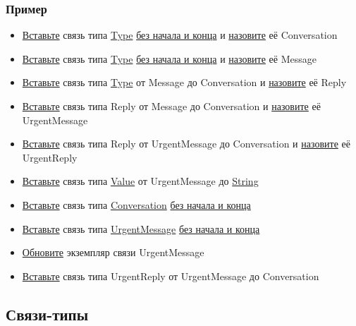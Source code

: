 \documentclass{article}
\begin{document}
\subsubsection{Пример}
\begin{itemize}
  \item \hyperlink{DeepCase.InsertLink.Def}{Вставьте} связь типа \hyperlink{type.Def}{Type} \hyperlink{FAQ.HowToInsertLinkWithoutFromAndTo}{без начала и конца} и \hyperlink{FAQ.HowToSetName}{назовите} её Conversation
  \item \hyperlink{DeepCase.InsertLink.Def}{Вставьте} связь типа \hyperlink{type.Def}{Type} \hyperlink{FAQ.HowToInsertLinkWithoutFromAndTo}{без начала и конца} и
  \hyperlink{FAQ.HowToSetName}{назовите} её Message
  \item \hyperlink{DeepCase.InsertLink.Def}{Вставьте} связь типа \hyperlink{type.Def}{Type} от Message до Conversation и \hyperlink{FAQ.HowToSetName}{назовите} её Reply
  \item \hyperlink{DeepCase.InsertLink.Def}{Вставьте} связь типа Reply от Message до Conversation и \hyperlink{FAQ.HowToSetName}{назовите} её UrgentMessage
  \item \hyperlink{DeepCase.InsertLink.Def}{Вставьте} связь типа Reply от UrgentMessage до Conversation и \hyperlink{FAQ.HowToSetName}{назовите} её UrgentReply
  \item \hyperlink{DeepCase.InsertLink.Def}{Вставьте} связь типа \hyperlink{Core.Value.Def}{Value} от UrgentMessage до \hyperlink{Core.String.Def}{String}
  \item \hyperlink{DeepCase.InsertLink.Def}{Вставьте} связь типа \hyperlink{type.Def}{Conversation} \hyperlink{FAQ.HowToInsertLinkWithoutFromAndTo}{без начала и конца}
  \item \hyperlink{DeepCase.InsertLink.Def}{Вставьте} связь типа \hyperlink{type.Def}{UrgentMessage} \hyperlink{FAQ.HowToInsertLinkWithoutFromAndTo}{без начала и конца}
  \item \hyperlink{DeepCase.UpdateLink.Def}{Обновите} экземпляр связи UrgentMessage
  \item \hyperlink{DeepCase.InsertLink.Def}{Вставьте} связь типа UrgentReply от UrgentMessage до Conversation
\end{itemize}

\subsection{Связи-типы}
\end{document}
